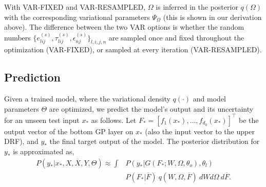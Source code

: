 \documentclass[conference]{IEEEtran}
\begin{document}
With VAR-FIXED and VAR-RESAMPLED, $\Omega$ is inferred  in the posterior $q(\Omega)$ with the corresponding variational parameters $\Psi_\Omega$ (this is shown in our derivation above). The difference between the two VAR options is whether the random numbers $\{ e^{(s)}_{lij}, \tau^{(s)}_{lij}, \epsilon^{(s)}_{nj} \}_{l,i,j,n}$ are sampled once and fixed throughout the optimization (VAR-FIXED), or sampled 
at every iteration (VAR-RESAMPLED).





\subsection{Prediction}\label{sec:prediction}

Given a trained model, where the variational density $q(\cdot)$ and model parameters $\Theta$ are optimized, we predict the model's 
output and its uncertainty for an unseen test input $x_*$ as follows. 
Let $F_* = [f_1(x_*), \dots, f_{d_0}(x_*)]^\top$ be the output vector of 
the bottom GP layer on $x_*$ (also the input vector to the upper DRF), 
and $y_*$ the final target output of the model.
The posterior distribution for $y_*$ is approximated as,
\begin{equation}
\begin{split}
P(y_*| x_*, X, \overline{X}, Y, \Theta) \approx
    \int &P(y_*|G(F_*; W, \Omega, \theta_o), \theta_l) 
    \\\ &P(F_*|\overline{F}) %
    \ q(W, \Omega, \overline{F}) \ dW d\Omega \ d\overline{F}.
\label{eq:pred_ys}
\end{split}
\end{equation}
\end{document}
